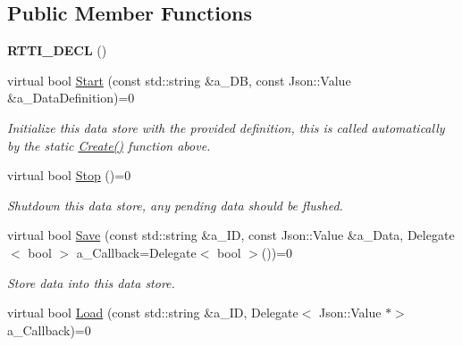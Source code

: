 \subsection*{Public Member Functions}
\begin{DoxyCompactItemize}
\item 
\mbox{\label{class_i_data_store_a5a691a3ac2aa9879709410e196e3d250}} 
{\bfseries R\+T\+T\+I\+\_\+\+D\+E\+CL} ()
\item 
\mbox{\label{class_i_data_store_ad16a9b26a9dc4aa9e8430bb7bc0ecc75}} 
virtual bool \hyperlink{class_i_data_store_ad16a9b26a9dc4aa9e8430bb7bc0ecc75}{Start} (const std\+::string \&a\+\_\+\+DB, const Json\+::\+Value \&a\+\_\+\+Data\+Definition)=0
\begin{DoxyCompactList}\small\item\em Initialize this data store with the provided definition, this is called automatically by the static \hyperlink{class_i_data_store_a6a7f42ad3819a45b20f2010a8a2715e4}{Create()} function above. \end{DoxyCompactList}\item 
\mbox{\label{class_i_data_store_a9f764bceb327bfedbc8d72ecfc7fb419}} 
virtual bool \hyperlink{class_i_data_store_a9f764bceb327bfedbc8d72ecfc7fb419}{Stop} ()=0
\begin{DoxyCompactList}\small\item\em Shutdown this data store, any pending data should be flushed. \end{DoxyCompactList}\item 
\mbox{\label{class_i_data_store_a48e11a033ab0e1791c8eae0127ae438d}} 
virtual bool \hyperlink{class_i_data_store_a48e11a033ab0e1791c8eae0127ae438d}{Save} (const std\+::string \&a\+\_\+\+ID, const Json\+::\+Value \&a\+\_\+\+Data, Delegate$<$ bool $>$ a\+\_\+\+Callback=Delegate$<$ bool $>$())=0
\begin{DoxyCompactList}\small\item\em Store data into this data store. \end{DoxyCompactList}\item 
\mbox{\label{class_i_data_store_a851dc94388fa6ea67be923075cd45446}} 
virtual bool \hyperlink{class_i_data_store_a851dc94388fa6ea67be923075cd45446}{Load} (const std\+::string \&a\+\_\+\+ID, Delegate$<$ Json\+::\+Value $\ast$$>$ a\+\_\+\+Callback)=0
$$
\end{DoxyCompactItemize}
